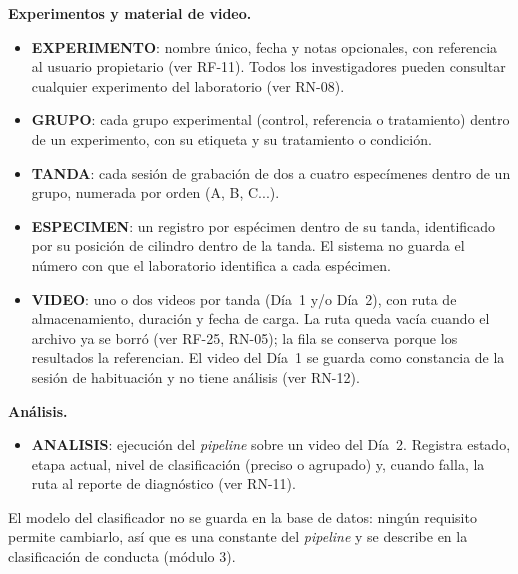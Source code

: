 \textbf{Experimentos y material de video.}
\begin{itemize}
  \item \textbf{EXPERIMENTO}: nombre único, fecha y notas opcionales, con
        referencia al usuario propietario (ver RF-11). Todos los investigadores pueden
        consultar cualquier experimento del laboratorio (ver RN-08).

  \item \textbf{GRUPO}: cada grupo experimental (control, referencia o
        tratamiento) dentro de un experimento, con su etiqueta y su
        tratamiento o condición.

  \item \textbf{TANDA}: cada sesión de grabación de dos a cuatro especímenes
        dentro de un grupo, numerada por orden (A, B, C...).

  \item \textbf{ESPECIMEN}: un registro por espécimen dentro de su tanda,
        identificado por su posición de cilindro dentro de la tanda. El sistema
        no guarda el número con que el laboratorio identifica a cada espécimen.

  \item \textbf{VIDEO}: uno o dos videos por tanda (Día~1 y/o Día~2), con
        ruta de almacenamiento, duración y fecha de carga. La ruta queda vacía
        cuando el archivo ya se borró (ver RF-25, RN-05); la fila se conserva
        porque los resultados la referencian. El video del Día~1 se guarda como
        constancia de la sesión de habituación y no tiene análisis (ver RN-12).
\end{itemize}

\textbf{Análisis.}
\begin{itemize}
  \item \textbf{ANALISIS}: ejecución del \textit{pipeline} sobre un video del Día~2. Registra
        estado, etapa actual, nivel de clasificación (preciso o agrupado) y,
        cuando falla, la ruta al reporte de diagnóstico (ver RN-11).
\end{itemize}

El modelo del clasificador no se guarda en la base de datos: ningún requisito
permite cambiarlo, así que es una constante del \textit{pipeline} y se describe en la
clasificación de conducta (módulo 3).

